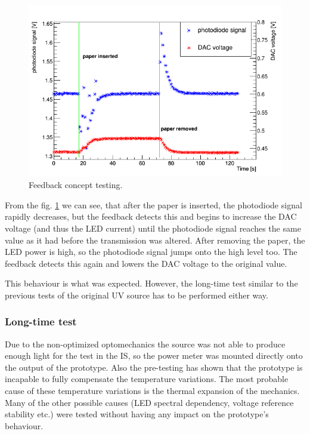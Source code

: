 \begin{figure}[H]
 \centering
 \includegraphics[scale=0.5]{./pictures/Stabilizin.png}
 \caption{Feedback concept testing.}
 \label{Feedback testing}
\end{figure}

From the fig. \ref{Feedback testing} we can see, that after the paper is inserted, the photodiode signal rapidly decreases, but the feedback detects this and begins to increase the DAC voltage (and thus the LED current) until the photodiode signal reaches the same value as it had before the transmission was altered. After removing the paper, the LED power is high, so the photodiode signal jumps onto the high level too. The feedback detects this again and lowers the DAC voltage to the original value. 
\par
This behaviour is what was expected. However, the long-time test similar to the previous tests of the original UV source has to be performed either way. 


\subsubsection{Long-time test}

Due to the non-optimized optomechanics the source was not able to produce enough light for the test in the IS, so the power meter was mounted directly onto the output of the prototype. Also the pre-testing has shown that the prototype is incapable to fully compensate the temperature variations. The most probable cause of these temperature variations is the thermal expansion of the mechanics. Many of the other possible causes (LED spectral dependency, voltage reference stability etc.) were tested without having any impact on the prototype's behaviour. 


